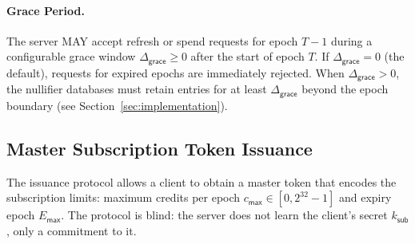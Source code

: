 \documentclass[11pt]{article}
\theoremstyle{definitionstyle}
\theoremstyle{plain}
\begin{document}
\paragraph{Grace Period.}
The server MAY accept refresh or spend requests for epoch $T-1$ during a configurable grace window $\Delta_{\mathsf{grace}} \ge 0$ after the start of epoch $T$. If $\Delta_{\mathsf{grace}} = 0$ (the default), requests for expired epochs are immediately rejected. When $\Delta_{\mathsf{grace}} > 0$, the nullifier databases must retain entries for at least $\Delta_{\mathsf{grace}}$ beyond the epoch boundary (see Section~\ref{sec:implementation}).

\subsection{Master Subscription Token Issuance}
The issuance protocol allows a client to obtain a master token that encodes the subscription limits: maximum credits per epoch $c_{\mathsf{max}} \in [0, 2^{32}-1]$ and expiry epoch $E_{\mathsf{max}}$. The protocol is blind: the server does not learn the client's secret $k_{\mathsf{sub}}$, only a commitment to it.
\end{document}
